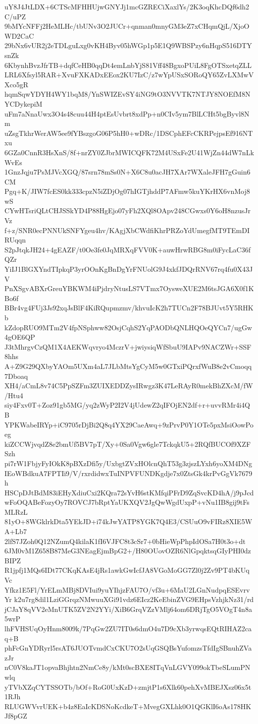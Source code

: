 uY8J4JtLDX+6CTScMFHHUjwGNYJj1mcGZRECiXaxlYs/2K3oqKhcDQf6dh2C/uPZ
9bMYcNFFj2HeMLHc/tbUNv3O2JUCr+qnman0mnyGM3eZ7xCHqmQjL/XjoOWD2CaC
29bNx6vUR2j2eTDLguLxg0vKH4Byv05hWGp1p5E1Q9WBSPzy6nHqpS516DTYsnZk
6KbynhBvzJfrTB+dqfCeHB0qqDt4emLnbYjS81Vff48BgxoPUiL8FgOTSxetqZLL
LRL6Xfsyl5RAR+XvuFXKADxEEox2KU7IzC/z7wYpUSxSORoQY65ZvLXMwVXco5gR
hqmSqwYDYH4WY1bqM8/YnSWIZEvSY4iNG9tO3NVVTK7NTJY8NOEfM8NYCDykepiM
uFm7aNnaUwx3O4s48cuu44H4ptEsUvbrt8xdPp+n0CIv5ym7BlLCHt5bgByvl8Nm
uZsgTkhrWerAW5ee9fYBszgoG06P5hH0+wDRc/1DSCphEFcCKRPejpsEf916NTxu
6GZa0CnnR3HsXnS/8f+nrZY0ZJbrMWICQFK72M4USxFe2U41WjZn44dW7nLkWvEs
1GnzJqju7PsMJVcXGQ/87srn78mSs0N+X6C8u0acJH7XAr7WXaleJFH7gGuin6CM
Pgq+K/JIW7fcES0kk333cpzN5iZDjOg07hIGTjhddP7AFmw5kuYKrHX6vnMoj8wS
CYwHTsriQLtCHJSSkYD4P88HgEjo07yFh2XQl8OApv248CGwxs0Y6oH8nzusJrVz
f+z/SNR0ecPNNUkSNFYgeu4hv/KAgjXbCWdfiKhrPRZoYdUmegfMT9TEmDIRUqqn
S2pJtqkJH24+4gEAZF/t0Oe3fe0JqMRXqFVV0K+auwHrwRBG8m0iFycLaC36fQZr
YiIJ1BlGXYndTIpkqP3yrOOnKgBnDgYrFNUolG9J4xkfJDQrRNV67rq4fu0X43JV
PnXSgvABXrGreuYBKWM4iPjdryNtusLS7VTmx7OysweXUE2M6tsJGA6X0f1KBo6f
BBr4vg4FUj3Js92xqJsBlF4KiRQupmzmv/khvuIcK2h7TUCn2F78BJUvt5Y5RHKb
kZdopRUO9MTm2V4fpNSphww82OsjCqhS2YqPAODbQNLHQOeQYCn7/ugGw4gOE6QP
J3tMhrgvCzQM1X4AEKWqvryo4MczrV+jwiysiqWfSbuU9IAPv9NACZWr+SSF8hhs
A+Z9G29QXbyYAOm5UXm4aL7JLbMtsYgCyM5w0GTxiPQrxfWuB8e2vCmoqq7Dboaq
XH4/aCmL8v74C5PpSZFm3ZUIXEDDZysIRwgz3K47LeRAyR0mekBhZXcM/fW/Htu4
siy4Fxv0T+Zoz91gb5MG/yq2zWyP2I2V4jUdewZ2qIFOjEN2df+r+uvvRMr4i4QB
YPKWabeIRYp+iC9705rDjBi2Q8q4YX29CaeAwq+9zPrvP0Y1OTe5pxMsiOowPoeg
kiZCCWjvqdZ8e2bmUf5BV7pT/Xy+0Sa0Vgw6gle7TckqkU5+2RQfBUCOf9XZFSzh
pi7rW1FbjyFyIOkK8pBXzDfi5y/UxbgtZVxHOlcnQhT53g3zjszLYxh6yoXM4DNg
IEoWBdkuA7FPTIi9/V/rxrdidwxTuINPVFUNDKgdje7x0ZtsGk4krPvGgVk7679h
HSCpDJtBdM83iEHyXdiuCxi2KQra72sYvH6stKMfqiPFrD9ZqSvcKD4hA/j9pJcd
wFoOQABeFozyOy7ROVCJ7bRptYaUKXQV2JgQwWgdUxpP+vNu1IB8gij9tFsMLRzL
81yO+8WGklrkDta5YEkJD+i74kJwYATP8YGK7Q4E3/CSUuO9vFIRz8XIE5WA+Lb7
2lfS7JZoh0Q12NZumQ4kilaK1fI6VJFC8t3cSr7+0bHieWpPhpIdOSa7H0t3o+dt
6JM0vM1Z658B87MeG3NEagEjmBpG2+/H80OUovOZR6NlGpqktsqGIyPHI0dzBIPZ
R1jpfj1MQs6IDt77CKqKAsE4jRs1awkGwIcfJA8VGoMoGG7Zl0j2Zv9PT4bKUqVc
Yfkz1E5Fl/YrELmMBj8DVIui9yuYIhjzFAU7O/vf3u+6MaU2LGnNudpqESEvrvYr
k2u7rg8dil1LziGGrqzNMwuuXGi91vdz6EIcz2KeEbinZVG9EHpsVzhjkNz31/rd
jCJaY8qVV2eMnUTK5ZV2N2YYi/XiB6GrqVZzVMlj64om6DRjTgO5VOgT4n8a5wrP
lhFVHSUqOyHnm8009k/7PqGw2ZU7IT0s6dmO4u7D9cXb3yrwqsEQtRIHAZ2caq+B
phFcGnYDRyrl5rsAT6JUOTvmdCxCKU7O2sUqGSQBsYufomzsTfdIgSBnuhZVazJr
nC0V8kaJT1opvaBhjhtn2NmCe8y/kMt0scBXE8ITqVnLGVY099okTbeSLumPNwlq
yTVbXZqCYTSSOTb/bOf+RoG0UxKzD+zmjtP1s6Xlk60pehXvMBEJXsz06x5t1RJh
RLUGWVvrUEK+b4z8EaIcKDSNoKcdkeT+MvegGXLhk0O1QGKlI6oAs178HKJf8pGZ
